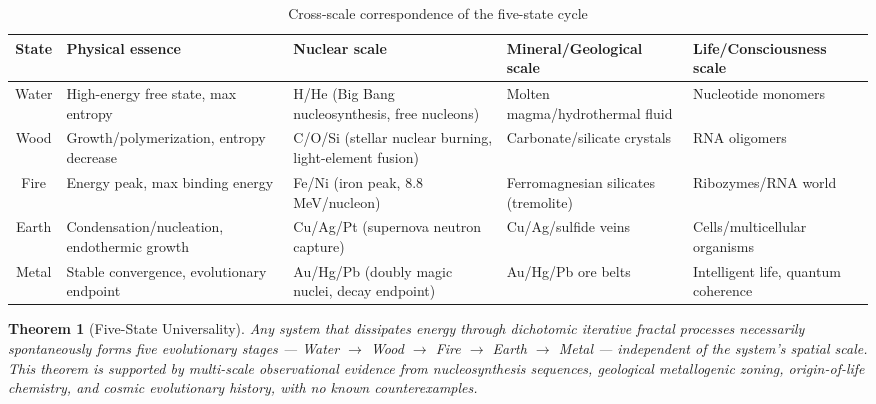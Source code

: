 \documentclass[12pt,a4paper,twocolumn]{article}
\newtheorem{theorem}{Theorem}[section]
\begin{document}
\begin{table}[H]
\centering
\footnotesize
\caption{Cross-scale correspondence of the five-state cycle}
\label{tab:five_states_cross_scale}
\begin{tabular}{c|p{2.5cm}|p{2.5cm}|p{2.5cm}|p{2.5cm}}
\hline
\textbf{State} & \textbf{Physical essence} & \textbf{Nuclear scale} & \textbf{Mineral/Geological scale} & \textbf{Life/Consciousness scale} \\
\hline
Water & High-energy free state, max entropy & H/He (Big Bang nucleosynthesis, free nucleons) & Molten magma/hydrothermal fluid & Nucleotide monomers \\
Wood & Growth/polymerization, entropy decrease & C/O/Si (stellar nuclear burning, light-element fusion) & Carbonate/silicate crystals & RNA oligomers \\
Fire & Energy peak, max binding energy & Fe/Ni (iron peak, 8.8\,MeV/nucleon) & Ferromagnesian silicates (tremolite) & Ribozymes/RNA world \\
Earth & Condensation/nucleation, endothermic growth & Cu/Ag/Pt (supernova neutron capture) & Cu/Ag/sulfide veins & Cells/multicellular organisms \\
Metal & Stable convergence, evolutionary endpoint & Au/Hg/Pb (doubly magic nuclei, decay endpoint) & Au/Hg/Pb ore belts & Intelligent life, quantum coherence \\
\hline
\end{tabular}
\end{table}

\begin{theorem}[Five-State Universality]
\label{thm:five_states_universal}
Any system that dissipates energy through dichotomic iterative fractal processes necessarily spontaneously forms five evolutionary stages --- Water $\to$ Wood $\to$ Fire $\to$ Earth $\to$ Metal --- independent of the system's spatial scale. This theorem is supported by multi-scale observational evidence from nucleosynthesis sequences, geological metallogenic zoning, origin-of-life chemistry, and cosmic evolutionary history, with no known counterexamples.
\end{theorem}
\end{document}
